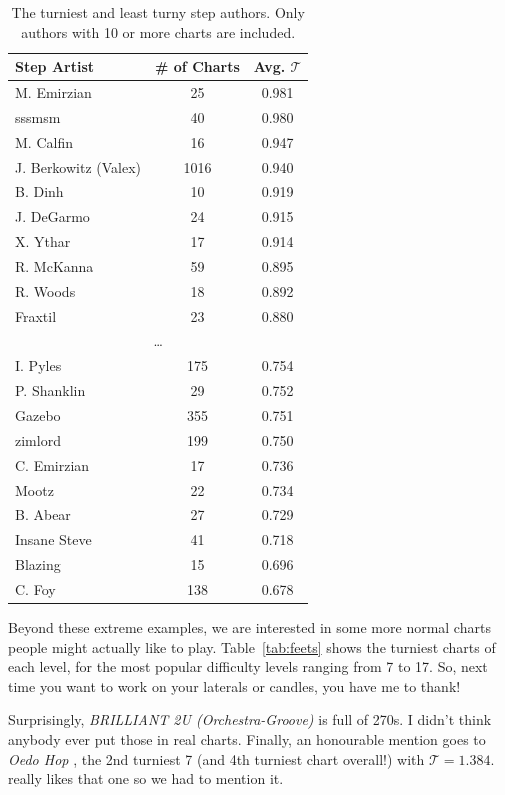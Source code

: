 \documentclass[10pt]{sigplanconf}
\begin{document}
\begin{table}[t]
	\begin{center}
		\small
	\begin{tabular}{l|c|c}
		Step Artist & \# of Charts & Avg. $\mathcal{T}$ \\
		\hline
		M. Emirzian & 25 & 0.981 \\
		sssmsm & 40 & 0.980 \\
		M. Calfin & 16 & 0.947 \\
		J. Berkowitz (Valex) & 1016 & 0.940 \\
		B. Dinh & 10 & 0.919 \\
		J. DeGarmo & 24 & 0.915 \\
		X. Ythar & 17 & 0.914 \\
		R. McKanna & 59 & 0.895 \\
		R. Woods & 18 & 0.892 \\
		Fraxtil & 23 & 0.880 \\
		\multicolumn{3}{c}{\normalsize\dots} \\
		I. Pyles & 175 & 0.754 \\
		P. Shanklin & 29 & 0.752 \\
		Gazebo & 355 & 0.751 \\
		zimlord & 199 & 0.750 \\
		C. Emirzian & 17 & 0.736 \\
		Mootz & 22 & 0.734 \\
		B. Abear & 27 & 0.729 \\
		Insane Steve & 41 & 0.718 \\
		Blazing & 15 & 0.696 \\
		C. Foy & 138 & 0.678 \\
	\end{tabular}
	\end{center}
	\caption{The turniest and least turny step authors. Only authors with 10 or more charts are included.}
	\label{tab:artist}
\end{table}
Beyond these extreme examples, we are interested in some more normal charts people might actually like to play.
Table~\ref{tab:feets} shows the turniest charts of each level, for the most popular difficulty levels ranging from 7 to 17.
So, next time you want to work on your laterals or candles, you have me to thank!

Surprisingly, {\em BRILLIANT 2U (Orchestra-Groove)} \cite{brilliant2u} is full of 270s. I didn't think anybody ever put those in real charts.
Finally, an honourable mention goes to {\em Oedo Hop} \cite{oedo}, the 2nd turniest 7 (and 4th turniest chart overall!) with $\mathcal{T}=1.384$.
\cite{deltax} really likes that one so we had to mention it.
\end{document}
